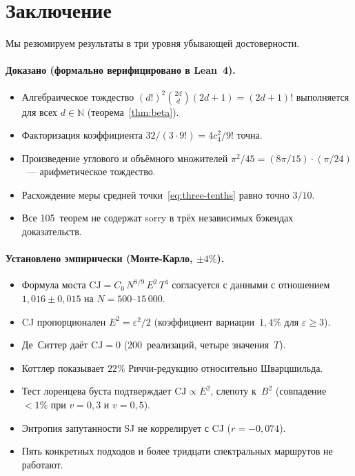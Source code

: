 \documentclass[12pt,a4paper]{article}
\theoremstyle{plain}
\theoremstyle{definition}
\theoremstyle{remark}
\newcommand{\CJ}{\mathrm{CJ}}
\begin{document}
\section{Заключение}
\label{sec:conclusions}

Мы резюмируем результаты в три уровня убывающей
достоверности.

\paragraph{Доказано (формально верифицировано в Lean~4).}
\begin{itemize}
\item Алгебраическое тождество $(d!)^2 \binom{2d}{d}(2d+1)
  = (2d+1)!$ выполняется для всех $d \in \mathbb{N}$
  (теорема~\ref{thm:beta}).
\item Факторизация коэффициента
  $32/(3 \cdot 9!) = 4 c_4^2 / 9!$ точна.
\item Произведение углового и объёмного множителей
  $\pi^2/45 = (8\pi/15) \cdot (\pi/24)$~--- арифметическое
  тождество.
\item Расхождение меры средней
  точки~\eqref{eq:three-tenths} равно точно $3/10$.
\item Все 105~теорем не содержат sorry в трёх независимых
  бэкендах доказательств.
\end{itemize}

\paragraph{Установлено эмпирически (Монте-Карло, $\pm 4\%$).}
\begin{itemize}
\item Формула моста $\CJ = C_0\, N^{8/9}\, E^2\, T^4$
  согласуется с данными с отношением $1{,}016 \pm 0{,}015$ на
  $N = 500$--$15\,000$.
\item CJ пропорционален $E^2 = \varepsilon^2/2$ (коэффициент
  вариации~$1{,}4\%$ для $\varepsilon \geq 3$).
\item Де~Ситтер даёт $\CJ = 0$ (200~реализаций, четыре
  значения~$T$).
\item Коттлер показывает $22\%$ Риччи-редукцию относительно
  Шварцшильда.
\item Тест лоренцева буста подтверждает $\CJ \propto E^2$,
  слепоту к~$B^2$ (совпадение $< 1\%$ при $v = 0{,}3$ и
  $v = 0{,}5$).
\item Энтропия запутанности SJ не коррелирует с CJ
  ($r = -0{,}074$).
\item Пять конкретных подходов и более тридцати спектральных
  маршрутов не работают.
\end{itemize}
\end{document}
